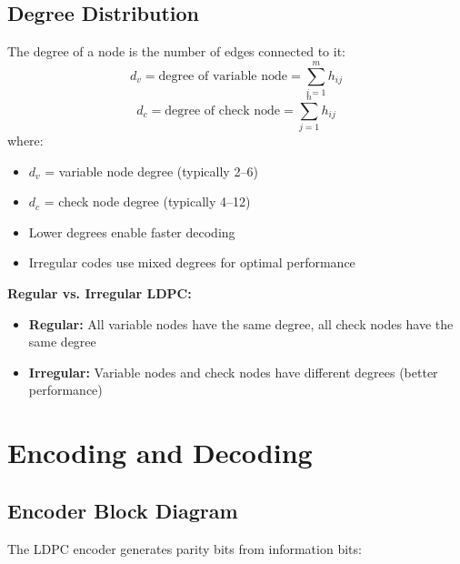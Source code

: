 \subsection{Degree Distribution}

The degree of a node is the number of edges connected to it:
\begin{equation}
d_v = \text{degree of variable node} = \sum_{i=1}^{m} h_{ij}
\end{equation}
\begin{equation}
d_c = \text{degree of check node} = \sum_{j=1}^{n} h_{ij}
\end{equation}
where:
\begin{itemize}
\item $d_v$ = variable node degree (typically 2--6)
\item $d_c$ = check node degree (typically 4--12)
\item Lower degrees enable faster decoding
\item Irregular codes use mixed degrees for optimal performance
\end{itemize}

\textbf{Regular vs. Irregular LDPC:}
\begin{itemize}
\item \textbf{Regular:} All variable nodes have the same degree, all check nodes have the same degree
\item \textbf{Irregular:} Variable nodes and check nodes have different degrees (better performance)
\end{itemize}

\section{Encoding and Decoding}

\subsection{Encoder Block Diagram}

The LDPC encoder generates parity bits from information bits:

